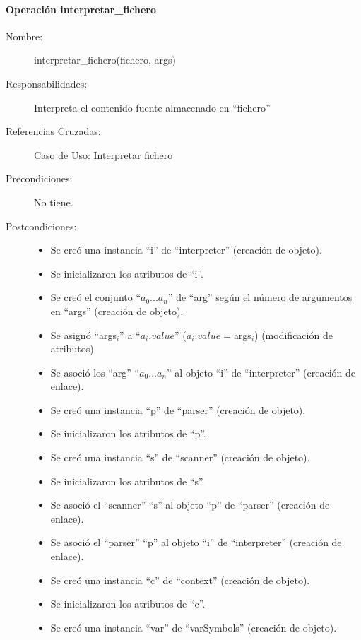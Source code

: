 \paragraph{Operación interpretar\_fichero}
\FloatBarrier
\begin{framed}
	\begin{description}
		\item [Nombre:] interpretar\_fichero(fichero, args)
		\item [Responsabilidades:] Interpreta el contenido fuente almacenado en ``fichero''
		\item [Referencias Cruzadas: ] Caso de Uso: Interpretar fichero
      \item [Precondiciones:] No tiene.
      \item [Postcondiciones:] \hfill
      \begin {itemize}
         \item Se creó una instancia ``i'' de ``interpreter'' (creación de objeto).
         \item Se inicializaron los atributos de ``i''.
         \item Se creó el conjunto ``$a_0...a_n$'' de ``arg'' según el número de argumentos en ``args'' (creación de objeto).
         \item Se asignó ``args$_i$'' a ``$a_i.value$'' ($a_i.value = $args$_i$) (modificación de atributos).
         \item Se asoció los ``arg'' ``$a_0...a_n$'' al objeto ``i'' de ``interpreter'' (creación de enlace).
         \item Se creó una instancia ``p'' de ``parser'' (creación de objeto).
         \item Se inicializaron los atributos de ``p''.
         \item Se creó una instancia ``s'' de ``scanner'' (creación de objeto).
         \item Se inicializaron los atributos de ``s''.
         \item Se asoció el ``scanner'' ``s'' al objeto ``p'' de ``parser'' (creación de enlace).
         \item Se asoció el ``parser'' ``p'' al objeto ``i'' de ``interpreter'' (creación de enlace).
         \item Se creó una instancia ``c'' de ``context'' (creación de objeto).
         \item Se inicializaron los atributos de ``c''.
         \item Se creó una instancia ``var'' de ``varSymbols'' (creación de objeto).

\end{itemize}
\end{description}
\end{framed}
